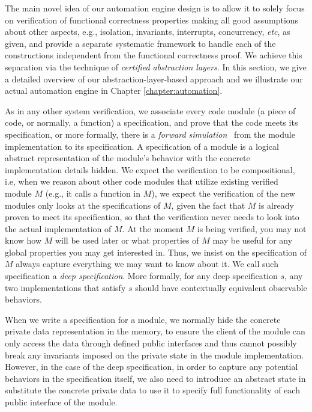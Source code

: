 
The main novel idea of our automation engine design is to allow it to solely focus on verification
of functional correctness properties making all good assumptions about other aspects,
e.g., isolation, invariants, interrupts, concurrency, {\it etc}, as given, and provide
a separate systematic framework to handle each of the constructions independent from the functional correctness proof.
We achieve this separation via the technique of \emph{certified abstraction layers}.
In this section, we give a detailed overview of our abstraction-layer-based
approach and we illustrate our actual automation engine in Chapter \ref{chapter:automation}.

As in any other system verification, we associate every code module (a piece of code,
or normally, a function)
a specification, and prove that the code meets its specification, or more
formally, there is a {\em forward simulation}~\cite{Lynch95} from the module
implementation to its specification. A specification of a module is a logical
abstract representation of the module's behavior with the concrete
implementation details hidden. We expect the verification to be compositional,
i.e, when we reason about other code modules that utilize existing verified
module $M$ (e.g., it calls a function in $M$), we expect the verification
of the new modules only looks at the specifications of $M$, given the fact
that $M$ is already proven to meet its specification, so that the verification
never needs to look into the actual implementation of $M$. At the moment $M$ is
being verified, you may not know how $M$ will be used later or what properties of
$M$ may be useful for any global properties you may get interested in.
Thus, we insist on the specification of $M$ always capture everything
we may want to know about it. We call such specification a {\em deep specification}.
More formally, for any deep specification $s$, any two implementations that satisfy $s$
should have contextually equivalent observable behaviors. 

When we write a specification for a module, we normally hide the
concrete private data representation in the memory, to ensure the client
of the module can only access the data through defined public interfaces
and thus cannot possibly break any invariants imposed on the private
state in the module implementation. However, in the case of the deep
specification, in order to capture any potential behaviors in the
specification itself, we also need to introduce an abstract state
in substitute the concrete private data to use it to specify
full functionality of each public interface of the module.

